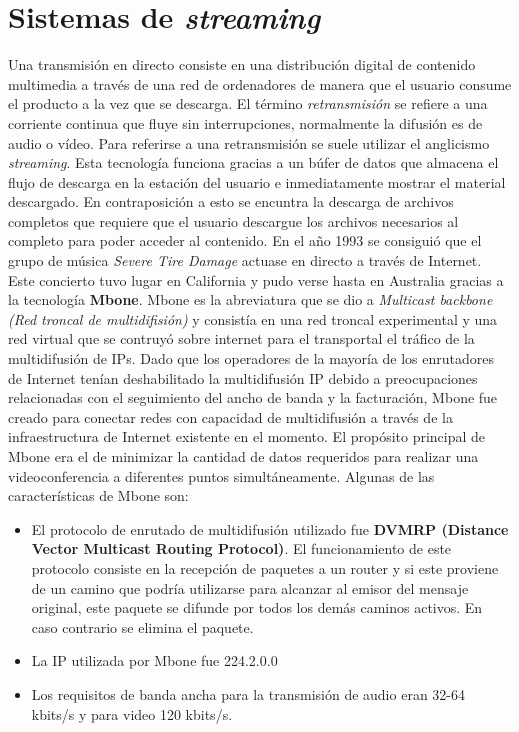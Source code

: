 \section{Sistemas de \textit{streaming}}

Una transmisi\'on en directo consiste en una distribuci\'on digital de contenido multimedia a trav\'es de una red de ordenadores de manera que el usuario consume el producto a la vez que se descarga. El t\'ermino \textit{retransmisi\'on} se refiere a una corriente continua que fluye sin interrupciones, normalmente la difusi\'on es de audio o v\'ideo. Para referirse a una retransmisi\'on se suele utilizar el anglicismo \textit{streaming}. Esta tecnolog\'ia funciona gracias a un b\'ufer de datos que almacena el flujo de descarga en la estaci\'on del usuario e inmediatamente mostrar el material descargado. En contraposici\'on a esto se encuntra la descarga de archivos completos que requiere que el usuario descargue los archivos necesarios al completo para poder acceder al contenido. En el a\~no 1993 se consigui\'o que el grupo de m\'usica \textit{Severe Tire Damage} actuase en directo a trav\'es de Internet. Este concierto tuvo lugar en California y pudo verse hasta en Australia gracias a la tecnolog\'ia \textbf{Mbone}. Mbone es la abreviatura que se dio a \textit{Multicast backbone (Red troncal de multidifisi\'on)} y consist\'ia en una red troncal experimental y una red virtual que se contruy\'o sobre internet para el transportal el tr\'afico de la multidifusi\'on de IPs. Dado que los operadores de la mayor\'ia de los enrutadores de Internet ten\'ian deshabilitado la multidifusi\'on IP debido a preocupaciones relacionadas con el seguimiento del ancho de banda y la facturaci\'on, Mbone fue creado para conectar redes con capacidad de multidifusi\'on a trav\'es de la infraestructura de Internet existente en el momento. El prop\'osito principal de Mbone era el de minimizar la cantidad de datos requeridos para realizar una videoconferencia a diferentes puntos simult\'aneamente. Algunas de las caracter\'isticas de Mbone son:\par

\begin{itemize}
\item El protocolo de enrutado de multidifusi\'on utilizado fue \textbf{DVMRP (Distance Vector Multicast Routing Protocol)}. El funcionamiento de este protocolo consiste en la recepci\'on de paquetes a un router y si este proviene de un camino que podr\'ia utilizarse para alcanzar al emisor del mensaje original, este paquete se difunde por todos los dem\'as caminos activos. En caso contrario se elimina el paquete. 
\item La IP utilizada por Mbone fue 224.2.0.0 
\item Los requisitos de banda ancha para la transmisi\'on de audio eran 32-64 kbits/s y para video 120 kbits/s.
\end{itemize}

